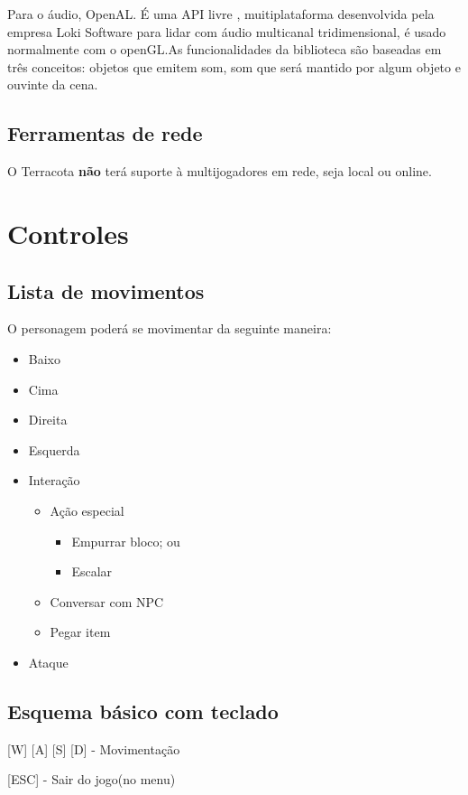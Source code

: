 \documentclass[12pt]{article}
\begin{document}
Para o áudio, OpenAL. É uma API livre , muitiplataforma desenvolvida pela empresa
Loki Software para lidar com áudio multicanal tridimensional, é usado normalmente
com o openGL.As funcionalidades da biblioteca são baseadas em três conceitos:
objetos que emitem som, som que será mantido por algum objeto e ouvinte da cena.

\subsection{Ferramentas de rede}
O Terracota {\bf não} terá suporte à multijogadores em rede, seja local ou online.

\section{Controles}

\subsection{Lista de movimentos}
O personagem poderá se movimentar da seguinte maneira:

\begin{itemize}
    \item Baixo
    \item Cima
    \item Direita
    \item Esquerda
    \item Interação
    \begin{itemize}
        \item Ação especial
        \begin{itemize}
            \item Empurrar bloco; ou
            \item Escalar
        \end{itemize}
        \item Conversar com NPC
        \item Pegar item
    \end{itemize}
    \item Ataque
\end{itemize}

\subsection{Esquema básico com teclado}

[W] [A] [S] [D] - Movimentação

[ESC] - Sair do jogo(no menu)
\end{document}
